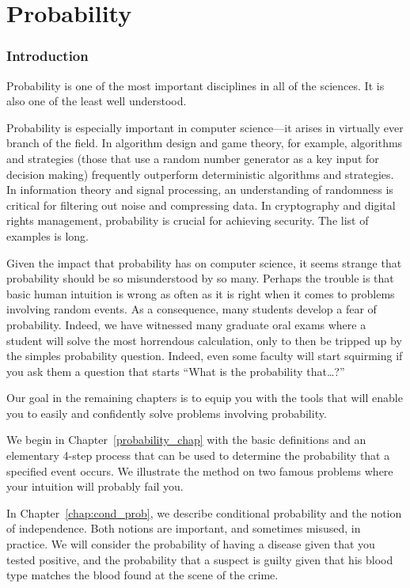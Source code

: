 \part{Probability}
\label{part:probability}

\clearpage

\section*{Introduction}

Probability is one of the most important disciplines in all of the
sciences.  It is also one of the least well understood.

Probability is especially important in computer science---it arises in
virtually ever branch of the field.  In algorithm design and game
theory, for example,  algorithms and strategies
(those that use a random number generator as a key input for decision
making) frequently outperform deterministic algorithms and
strategies.  In information theory and signal processing, an
understanding of randomness is critical for filtering out noise and
compressing data.  In cryptography and digital rights management,
probability is crucial for achieving security.  The list of examples
is long.

Given the impact that probability has on computer science, it seems
strange that probability should be so misunderstood by so many.
Perhaps the trouble is that basic human intuition is wrong as often as
it is right when it comes to problems involving random events.  As a
consequence, many students develop a fear of probability.  Indeed, we
have witnessed many graduate oral exams where a student will solve the
most horrendous calculation, only to then be tripped up by the simples
probability question.  Indeed, even some faculty will start squirming
if you ask them a question that starts ``What is the probability
that\dots?''

Our goal in the remaining chapters is to equip you with the tools that
will enable you to easily and confidently solve problems involving
probability.

We begin in Chapter~\ref{probability_chap} with the basic definitions
and an elementary 4-step process that can be used to determine the
probability that a specified event occurs.  We illustrate the method
on two famous problems where your intuition will probably fail you.

In Chapter~\ref{chap:cond_prob}, we describe conditional probability and
the notion of independence.  Both notions are important, and sometimes
misused, in practice.  We will consider the probability of having a
disease given that you tested positive, and the probability that a
suspect is guilty given that his blood type matches the blood found at
the scene of the crime.

